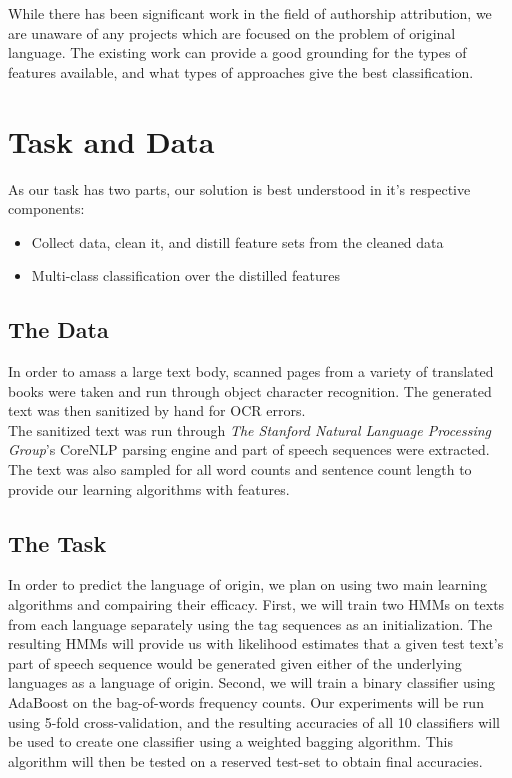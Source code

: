 \documentclass[11pt,letterpaper]{article}
\begin{document}
While there has been significant work in the field of authorship attribution,
\cite{one}\cite{two}\cite{three} we are unaware of any projects which are
focused on the problem of original language. The existing work can provide a
good grounding for the types of features available, and what types of approaches
give the best classification.




\section{Task and Data}
As our task has two parts, our solution is best understood in it's respective
components: 

\begin{itemize} 
  \item Collect data, clean it, and distill feature sets from the cleaned data
  \item Multi-class classiﬁcation over the distilled features 
\end{itemize}

\subsection{The Data} In order to amass a large text body, scanned pages from a
variety of translated books were taken and run through object character
recognition.  The generated text was then sanitized by hand for OCR errors.\\

The sanitized text was run through {\it The Stanford Natural Language
Processing Group}'s CoreNLP parsing engine and part of speech sequences were
extracted.  The text was also sampled for all word counts and sentence count
length to provide our learning algorithms with features.

\subsection{The Task} In order to predict the language of origin, we plan
on using two main learning algorithms and compairing their efficacy.  First, we
will train two HMMs on texts from each language separately using the tag
sequences as an initialization.  The resulting HMMs will provide us with
likelihood estimates that a given test text's part of speech sequence would be
generated given either of the underlying languages as a language of origin.
Second, we will train a binary classifier using AdaBoost on the bag-of-words
frequency counts.  Our experiments will be run using 5-fold cross-validation,
and the resulting accuracies of all 10 classifiers will be used to create one
classifier using a weighted bagging algorithm.  This algorithm will then be
tested on a reserved test-set to obtain final accuracies.
\end{document}

